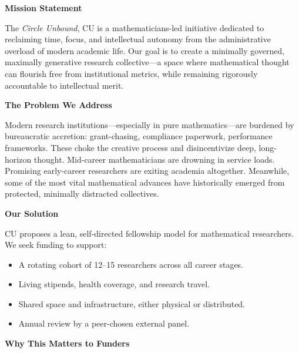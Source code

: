 \newpage
\begin{tcolorbox}[colback=gray!5, colframe=black, boxrule=0.3mm, sharp corners, width=\dimexpr\textwidth+1.1cm\relax, enlarge left by=0mm]

{\scriptsize\ttfamily

\vspace{1em}
\noindent\textbf{\large Mission Statement}
\vspace{0.5em}

The \textit{Circle Unbound}, CU is a mathematicians-led initiative dedicated to reclaiming time, focus, and intellectual autonomy from the administrative overload of modern academic life. Our goal is to create a minimally governed, maximally generative research collective—a space where mathematical thought can flourish free from institutional metrics, while remaining rigorously accountable to intellectual merit.

\vspace{0.8em}
\noindent\textbf{The Problem We Address}
\vspace{0.3em}

Modern research institutions—especially in pure mathematics—are burdened by bureaucratic accretion: grant-chasing, compliance paperwork, performance frameworks. These choke the creative process and disincentivize deep, long-horizon thought. Mid-career mathematicians are drowning in service loads. Promising early-career researchers are exiting academia altogether. Meanwhile, some of the most vital mathematical advances have historically emerged from protected, minimally distracted collectives.

\vspace{0.8em}
\noindent\textbf{Our Solution}
\vspace{0.3em}

CU proposes a lean, self-directed fellowship model for mathematical researchers. We seek funding to support:
{\scriptsize
\begin{itemize}
  \setlength\itemsep{2pt}
  \setlength\parsep{0pt}
  \item A rotating cohort of 12--15 researchers across all career stages.
  \item Living stipends, health coverage, and research travel.
  \item Shared space and infrastructure, either physical or distributed.
  \item Annual review by a peer-chosen external panel.
\end{itemize}
}
\vspace{0.8em}
\noindent\textbf{Why This Matters to Funders}

}
\end{tcolorbox}

